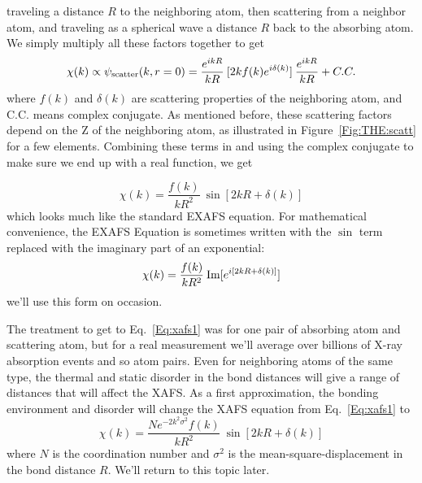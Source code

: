 \noindent
traveling a distance $R$ to the neighboring atom, then scattering from a
neighbor atom, and traveling as a spherical wave a distance $R$ back to the
absorbing atom. We simply multiply all these factors together to get
\begin{equation}
  \chi(k) \propto \psi_{\rm{scatter}}(k,r=0) =
  {\frac{e^{ikR}}{kR}}\>
    [{2k f(k)e^{i\delta(k)}}] \>
    {\frac{e^{ikR}}{kR}} + C.C.
    \label{Eq:xafs0}
\end{equation}
\noindent
where $f(k)$ and $\delta(k)$ are scattering properties of the neighboring
atom, and C.C. means complex conjugate.  As mentioned before, these
scattering factors depend on the Z of the neighboring atom, as illustrated
in Figure~\ref{Fig:THE:scatt} for a few elements.  Combining these terms in
and using the complex conjugate to make sure we end up with a real
function, we get

\begin{equation}
  \chi(k) =
    {\frac{f(k)}{kR^2}}\>
    \sin[2kR + \delta(k)]
\label{Eq:xafs1}
\end{equation}
\noindent
which looks much like the standard EXAFS equation.  For
mathematical convenience,  the EXAFS Equation is sometimes written with the
$\sin$ term replaced with the imaginary part of an exponential:
\begin{equation}
  \chi(k) =
    {\frac{f(k)}{kR^2}}\> {\rm{Im}}  [e^{i[2kR + \delta(k)]}]
\label{Eq:xafs1a}
\end{equation}
we'll use this form on occasion.

The treatment to get to Eq.~\ref{Eq:xafs1} was for one pair of absorbing
atom and scattering atom, but for a real measurement we'll average over
billions of X-ray absorption events and so atom pairs. Even for neighboring
atoms of the same type, the thermal and static disorder in the bond
distances will give a range of distances that will affect the XAFS. As a
first approximation, the bonding environment and disorder will change the
XAFS equation from Eq.~\ref{Eq:xafs1} to
\begin{equation}
  \chi(k) =
      {{ \frac{N e^{-2k^2\sigma^2} f(k)}{kR^2}}}\>
      \sin[2kR + \delta(k)]
      \label{Eq:xafs2}
\end{equation}
\noindent
where $N$ is the coordination number and $\sigma^2$ is the
mean-square-displacement in the bond distance $R$.    We'll return to this
topic later.

